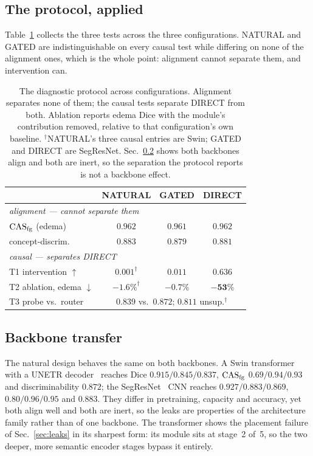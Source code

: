 \subsection{The protocol, applied}
\label{sec:summary}
Table~\ref{tab:protocol} collects the three tests across the three configurations. NATURAL and
GATED are indistinguishable on every causal test while differing on none of the alignment ones,
which is the whole point: alignment cannot separate them, and intervention can.

\begin{table}[t]\centering\footnotesize
\setlength{\tabcolsep}{4pt}
\caption{The diagnostic protocol across configurations. Alignment separates none of them; the
causal tests separate DIRECT from both. Ablation reports edema Dice with the module's contribution
removed, relative to that configuration's own baseline. $^\dagger$NATURAL's three causal entries are
Swin; GATED and DIRECT are SegResNet. Sec.~\ref{sec:backbone2} shows both backbones align and both
are inert, so the separation the protocol reports is not a backbone effect.}
\label{tab:protocol}
\begin{tabular}{lccc}
\toprule
& NATURAL & GATED & \textbf{DIRECT} \\
\midrule
\multicolumn{4}{l}{\emph{alignment --- cannot separate them}}\\
$\mathrm{CAS}_{\mathrm{fg}}$ (edema)                & $0.962$ & $0.961$ & $0.962$ \\
concept-discrim.                & $0.883$ & $0.879$ & $0.881$ \\
\midrule
\multicolumn{4}{l}{\emph{causal --- separates DIRECT}}\\
T1 intervention $\uparrow$      & $0.001^\dagger$ & $0.011$ & $\mathbf{0.636}$ \\
T2 ablation, edema $\downarrow$ & $-1.6\%^\dagger$ & $-0.7\%$ & $\mathbf{-53\%}$ \\
T3 probe vs.\ router            & \multicolumn{3}{c}{$0.839$ vs.\ $0.872$; $0.811$ unsup.$^\dagger$} \\
\bottomrule
\end{tabular}
\end{table}

\subsection{Backbone transfer}
\label{sec:backbone2}
The natural design behaves the same on both backbones. A Swin transformer~\cite{liu2021swin,dosovitskiy2021vit} with a UNETR
decoder~\cite{hatamizadeh2022unetr}
reaches Dice $0.915/0.845/0.837$, $\mathrm{CAS}_{\mathrm{fg}}$ $0.69/0.94/0.93$ and discriminability $0.872$; the
SegResNet~\cite{myronenko2018segresnet} CNN reaches $0.927/0.883/0.869$, $0.80/0.96/0.95$ and $0.883$. They differ in
pretraining, capacity and accuracy, yet both align well and both are inert, so the leaks are
properties of the architecture family rather than of one backbone. The transformer shows the
placement failure of Sec.~\ref{sec:leaks} in its sharpest form: its module sits at stage~2 of~5,
so the two deeper, more semantic encoder stages bypass it entirely.

